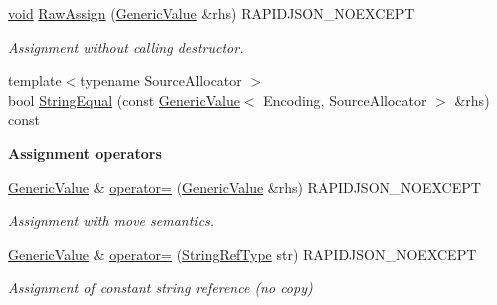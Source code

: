 \begin{DoxyCompactItemize}
\hyperlink{imgui__impl__opengl3__loader_8h_ac668e7cffd9e2e9cfee428b9b2f34fa7}{void} \hyperlink{classGenericValue_abb8ea2dfbe74ff4ee7dac6be31317f81}{Raw\+Assign} (\hyperlink{classGenericValue}{Generic\+Value} \&rhs) R\+A\+P\+I\+D\+J\+S\+O\+N\+\_\+\+N\+O\+E\+X\+C\+E\+PT
\begin{DoxyCompactList}\small\item\em Assignment without calling destructor. \end{DoxyCompactList}\item 
{\footnotesize template$<$typename Source\+Allocator $>$ }\\bool \hyperlink{classGenericValue_ad4d088dc601d99fea9d16300a7ec7ee1}{String\+Equal} (const \hyperlink{classGenericValue}{Generic\+Value}$<$ Encoding, Source\+Allocator $>$ \&rhs) const
\end{DoxyCompactItemize}
\begin{Indent}\textbf{ Assignment operators}\par
\begin{DoxyCompactItemize}
\item 
\hyperlink{classGenericValue}{Generic\+Value} \& \hyperlink{classGenericValue_a9018a40d7c52efc00daf803c51d3236c}{operator=} (\hyperlink{classGenericValue}{Generic\+Value} \&rhs) R\+A\+P\+I\+D\+J\+S\+O\+N\+\_\+\+N\+O\+E\+X\+C\+E\+PT
\begin{DoxyCompactList}\small\item\em Assignment with move semantics. \end{DoxyCompactList}\item 
\hyperlink{classGenericValue}{Generic\+Value} \& \hyperlink{classGenericValue_a386708557555e6389184de608af5e6a6}{operator=} (\hyperlink{classGenericValue_a32e0f30ee278072374c8168b14d3317f}{String\+Ref\+Type} str) R\+A\+P\+I\+D\+J\+S\+O\+N\+\_\+\+N\+O\+E\+X\+C\+E\+PT
\begin{DoxyCompactList}\small\item\em Assignment of constant string reference (no copy) \end{DoxyCompactList}\end{DoxyCompactItemize}
\end{Indent}
